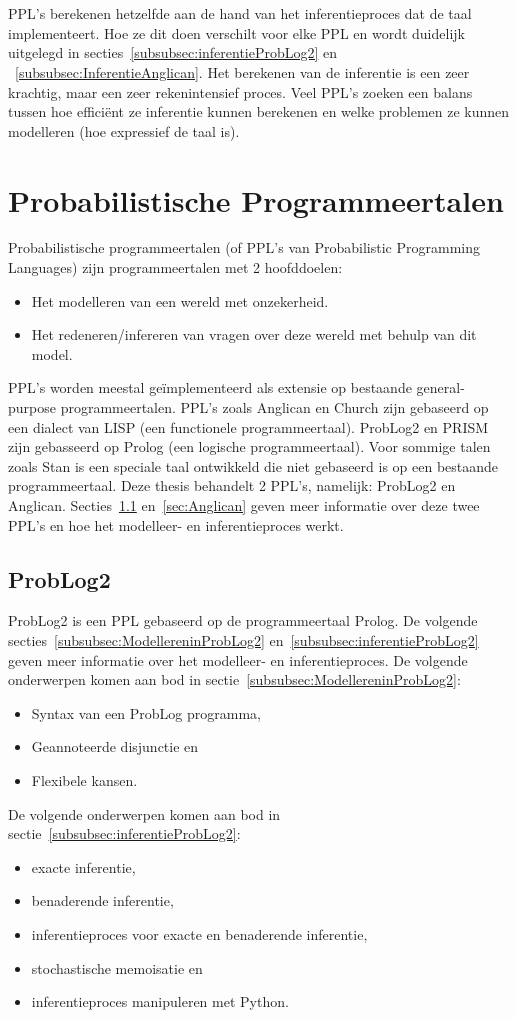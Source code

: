 \documentclass[12pt,a4paper,oneside]{book}
\theoremstyle{definition}
\begin{document}
\\\\
PPL's berekenen hetzelfde aan de hand van het inferentieproces dat de taal implementeert. Hoe ze dit doen verschilt voor elke PPL en wordt duidelijk uitgelegd in secties~\ref{subsubsec:inferentieProbLog2} en ~\ref{subsubsec:InferentieAnglican}. Het berekenen van de inferentie is een zeer krachtig, maar een zeer rekenintensief proces. Veel PPL's zoeken een balans tussen hoe effici\"{e}nt ze inferentie kunnen berekenen en welke problemen ze kunnen modelleren (hoe expressief de taal is).

\section{Probabilistische Programmeertalen}
Probabilistische programmeertalen (of PPL's van Probabilistic Programming Languages) zijn programmeertalen met 2 hoofddoelen:
\begin{itemize}
  \item Het modelleren van een wereld met onzekerheid.
  \item Het redeneren/infereren van vragen over deze wereld met behulp van dit model.
\end{itemize}
PPL's worden meestal ge\"{i}mplementeerd als extensie op bestaande general-purpose programmeertalen. PPL's zoals Anglican en Church zijn gebaseerd op een dialect van LISP (een functionele programmeertaal). ProbLog2 en PRISM zijn gebasseerd op Prolog (een logische programmeertaal). Voor sommige talen zoals Stan is een speciale taal ontwikkeld die niet gebaseerd is op een bestaande programmeertaal.
Deze thesis behandelt 2 PPL's, namelijk: ProbLog2 en Anglican. Secties~\ref{sec:ProbLog2} en~\ref{sec:Anglican} geven meer informatie over deze twee PPL's en hoe het modelleer- en inferentieproces werkt.
\subsection{ProbLog2}
\label{sec:ProbLog2}
ProbLog2 is een PPL gebaseerd op de programmeertaal Prolog. De volgende secties~\ref{subsubsec:ModellereninProbLog2} en~\ref{subsubsec:inferentieProbLog2} geven meer informatie over het modelleer- en inferentieproces. De volgende onderwerpen komen aan bod in sectie~\ref{subsubsec:ModellereninProbLog2}:
\begin{itemize}
	\item Syntax van een ProbLog programma,
	\item Geannoteerde disjunctie en
	\item Flexibele kansen.
\end{itemize} 
De volgende onderwerpen komen aan bod in sectie~\ref{subsubsec:inferentieProbLog2}:
\begin{itemize}
	\item exacte inferentie,
	\item benaderende inferentie,
	\item inferentieproces voor exacte en benaderende inferentie,
	\item stochastische memoisatie en
	\item inferentieproces manipuleren met Python.
\end{itemize} 
\end{document}
